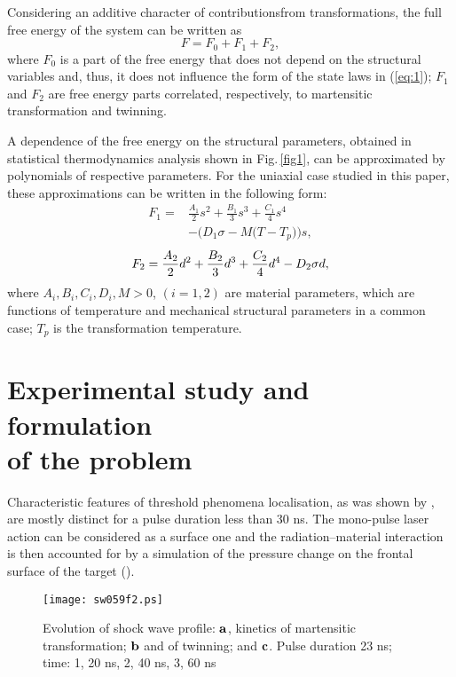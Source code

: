 \documentclass[sw,bibself]{svjour}
\newcommand{\fakefignlabel}[2]{\refstepcounter{figure}\label{#2}%
\addtocounter{figure}{-1}\def\thefigure{#1}}
\begin{document}
Considering an additive character of contributions\break from
transformations, the full free energy of the system can be written as
%
\begin{equation}
F = F_{0} + F_{1} + F_{2},
\end{equation}
%
where $F_{0}$ is a part of the free energy that does not depend on the
structural variables and, thus, it does not influence the form of the state
laws in (\ref{eq:1}); $F_{1}$ and $F_{2}$ are free energy parts
correlated, respectively, to martensitic transformation and twinning.

A dependence of the free energy on the structural parameters, obtained in
statistical thermodynamics analysis shown in Fig.\,\ref{fig1}, can be
approximated
by polynomials of respective parameters. For the uniaxial case studied
in this paper, these approximations can be written in the following form:
\begin{equation}
\begin{array}{rl}
F_{1}={}&\displaystyle \frac{A_{1}}{2} s^{2}
+ \frac{B_{1}}{3} s^{3}
+ \frac{C_{1}}{4} s^{4}\\[2mm]
&- \Big (D_{1} \sigma - M \big (T - T_{p} \big) \Big) s,
\end{array}
\end{equation}
\begin{equation}
F_{2} = {{A_{2}} \over 2} d^{2} + {{B_{2}} \over 3} d^{3}
+ {{C_{2}} \over 4} d^{4} - D_{2} \sigma d,
\end{equation}
where  $A_{i}, B_{i}, C_{i}, D_{i}, M > 0$,
$(i = 1,2)$ are material parameters, which are functions of
temperature and mechanical structural parameters in a common case;
$T_{p}$ is the transformation temperature.

\section{Experimental study and formulation\\%
of the problem}
Characteristic features of threshold phenomena localisation,
as was shown by \cite{ref2}, are mostly distinct for a pulse
duration less than 30 ns. The mono-pulse laser action can be considered
as a surface one and the radiation--material interaction is then
accounted
for by a simulation of the pressure change on the frontal surface of
the target (\cite{ref6}).

\begin{figure}
\fakefignlabel{2a--c}{fig2}
\centering\leavevmode\texttt{[image: sw059f2.ps]}
\caption{Evolution of shock wave profile:
${\bf a}$, kinetics of martensitic transformation;
${\bf b}$ and of twinning; and ${\bf c}$.
Pulse duration 23 ns; time: 1, 20 ns, 2, 40 ns, 3, 60 ns}
\end{figure}
\end{document}
